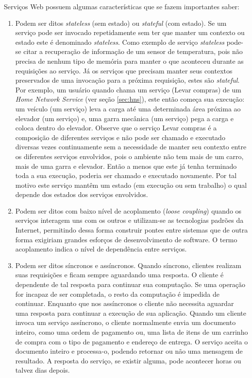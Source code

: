 Serviços Web possuem algumas características que se fazem importantes saber:
\begin{enumerate}
\item Podem ser ditos \textit{stateless} (sem estado) ou \textit{stateful} (com estado). Se um serviço pode ser invocado repetidamente sem ter que manter um contexto ou estado este é denominado \textit{stateless}. Como exemplo de serviço \textit{stateless} pode-se citar a recuperação de informação de um sensor de temperatura, pois não precisa de nenhum tipo de memória para manter o que aconteceu durante as requisições ao serviço. Já os serviços que precisam manter seus contextos preservados de uma invocação para a próxima requisição, estes são \textit{stateful}. Por exemplo, um usuário quando chama um serviço (Levar compras) de um \textit{Home Network Service} (ver seção \ref{sec:hns}), este então começa sua execução: um veículo (um serviço) leva a carga até uma determinada área próxima ao elevador (um serviço) e, uma garra mecânica (um serviço) pega a carga e coloca dentro do elevador. Observe que o serviço Levar compras é a composição de diferentes serviços e não pode ser chamado e executado diversas vezes continuamente sem a necessidade de manter seu contexto entre os diferentes serviços envolvidos, pois o ambiente não tem mais de um carro, mais de uma garra e elevador. Então a menos que este já tenha terminado toda a sua execução, poderia ser chamado e executado novamente. Por tal motivo este serviço mantêm um estado (em execução ou sem trabalho) o qual depende dos estados dos serviços envolvidos.\cite{Papazoglou:2008}
\item Podem ser ditos com baixo nível de acoplamento (\textit{loose coupling}) quando os serviços interagem uns com os outros e utilizam-se as tecnologias padrões da Internet, permitindo dessa forma construir pontes entre sistemas que de outra forma exigiriam grandes esforços de desenvolvimento de software. O termo acoplamento indica o nível de dependência entre serviços.\cite{Papazoglou:2008}
\item Podem ser ditos síncronos e assíncronos. Quando síncrono, clientes realizam suas requisições e ficam sempre aguardando uma resposta. O cliente é dependente de tal resposta para continuar sua computação. Se uma operação for incapaz de ser completada, o resto da computação é impedida de continuar. Enquanto que nos assíncronos o cliente não necessita aguardar uma resposta para continuar a execução de sua aplicação. Quando um cliente invoca um serviço assíncrono, o cliente normalmente envia um documento inteiro, como uma ordem de pagamento ou, uma lista de itens de um carrinho de compra com o tipo de pagamento e endereço de entrega. O serviço aceita o documento inteiro e processa-o, podendo retornar ou não uma mensagem de resultado. A resposta do serviço, se existir alguma, pode acontecer horas ou talvez dias depois.\cite{Papazoglou:2008}
\end{enumerate}

